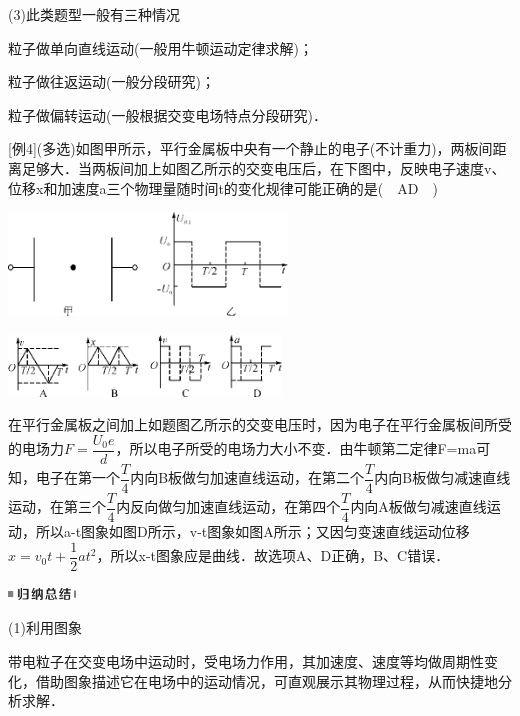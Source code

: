 (3)此类题型一般有三种情况

粒子做单向直线运动(一般用牛顿运动定律求解)；

粒子做往返运动(一般分段研究)；

粒子做偏转运动(一般根据交变电场特点分段研究)．

{[}例4{]}(多选)如图甲所示，平行金属板中央有一个静止的电子(不计重力)，两板间距离足够大．当两板间加上如图乙所示的交变电压后，在下图中，反映电子速度v、位移x和加速度a三个物理量随时间t的变化规律可能正确的是(　AD　)

\begin{center}\includegraphics[width=2.91667in,height=1.08333in]{media/image301.png}\end{center}
\begin{center}\includegraphics[width=2.85417in,height=0.64583in]{media/image302.png}\end{center}

\begin{solution}
	在平行金属板之间加上如题图乙所示的交变电压时，因为电子在平行金属板间所受的电场力$F=\dfrac{U_{0} e}{d}$，所以电子所受的电场力大小不变．由牛顿第二定律F=ma可知，电子在第一个$\dfrac{T}{4}$内向B板做匀加速直线运动，在第二个$\dfrac{T}{4}$内向B板做匀减速直线运动，在第三个$\dfrac{T}{4}$内反向做匀加速直线运动，在第四个$\dfrac{T}{4}$内向A板做匀减速直线运动，所以a-t图象如图D所示，v-t图象如图A所示；又因匀变速直线运动位移$x=v_0t+\dfrac{1}{2}at^2$，所以x-t图象应是曲线．故选项A、D正确，B、C错误．
\end{solution}
\begin{center}\includegraphics[width=0.70833in,height=0.125in]{media/image13.png}\end{center}

(1)利用图象

带电粒子在交变电场中运动时，受电场力作用，其加速度、速度等均做周期性变化，借助图象描述它在电场中的运动情况，可直观展示其物理过程，从而快捷地分析求解．


